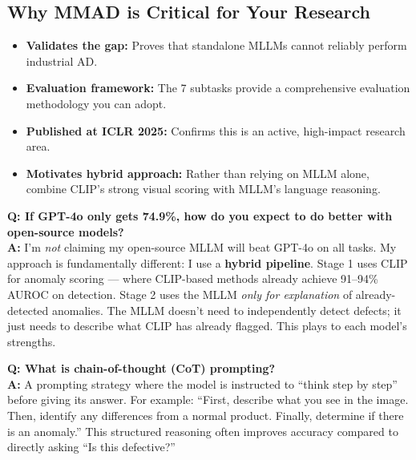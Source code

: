 \documentclass[12pt, a4paper]{article}
\begin{document}
\subsection{Why MMAD is Critical for Your Research}
\begin{itemize}[leftmargin=*]
    \item \textbf{Validates the gap:} Proves that standalone MLLMs cannot reliably perform industrial AD.
    \item \textbf{Evaluation framework:} The 7 subtasks provide a comprehensive evaluation methodology you can adopt.
    \item \textbf{Published at ICLR 2025:} Confirms this is an active, high-impact research area.
    \item \textbf{Motivates hybrid approach:} Rather than relying on MLLM alone, combine CLIP's strong visual scoring with MLLM's language reasoning.
\end{itemize}

\begin{vivaqa}
\textbf{Q: If GPT-4o only gets 74.9\%, how do you expect to do better with open-source models?}\\[4pt]
\textbf{A:} I'm \textit{not} claiming my open-source MLLM will beat GPT-4o on all tasks. My approach is fundamentally different: I use a \textbf{hybrid pipeline}. Stage 1 uses CLIP for anomaly scoring --- where CLIP-based methods already achieve 91--94\% AUROC on detection. Stage 2 uses the MLLM \textit{only for explanation} of already-detected anomalies. The MLLM doesn't need to independently detect defects; it just needs to describe what CLIP has already flagged. This plays to each model's strengths.
\end{vivaqa}

\begin{vivaqa}
\textbf{Q: What is chain-of-thought (CoT) prompting?}\\[4pt]
\textbf{A:} A prompting strategy where the model is instructed to ``think step by step'' before giving its answer. For example: ``First, describe what you see in the image. Then, identify any differences from a normal product. Finally, determine if there is an anomaly.'' This structured reasoning often improves accuracy compared to directly asking ``Is this defective?''
\end{vivaqa}


\end{document}
